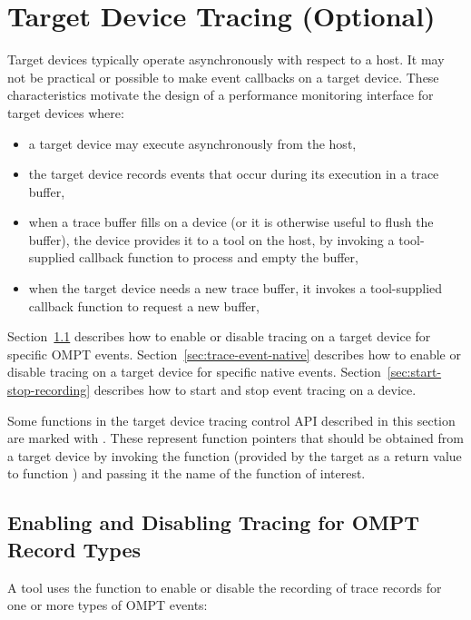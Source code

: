 \documentclass{article}
\begin{document}
\section{Target Device Tracing (Optional)}
\label{sec:target-device-records}

Target devices typically operate asynchronously with respect to a host. It may not be practical or possible to make event callbacks on a target device. These characteristics motivate the design of a performance monitoring interface for target devices where: 
\begin{itemize}
\item a target device may execute asynchronously from the host,
\item the target device records events that occur during its execution in a trace buffer,
\item when a trace buffer fills on a device (or it is otherwise useful to flush the buffer),  the device provides it to a tool on the host, by invoking a tool-supplied callback function to process and empty the buffer,
\item when the target device needs a new trace buffer, it invokes a tool-supplied callback function to request a new buffer,
\end{itemize}


 Section~\ref{sec:trace-event}  describes how to enable or disable tracing on a target device for specific OMPT events. 
  Section~\ref{sec:trace-event-native}  describes how to enable or disable tracing on a target device for specific native events. Section~\ref{sec:start-stop-recording} describes how to start and stop event tracing on a device. 
  
Some functions in the target device tracing control API described in this section are marked with . These represent function pointers that should be obtained from a target device by invoking the  function (provided by the target  as a return value to function ) and passing it the name of the function of interest.

\subsection{Enabling and Disabling Tracing for OMPT Record Types}
\label{sec:trace-event}
A tool uses the function  to enable or disable the recording of trace records for one or more types of OMPT events:
\end{document}
